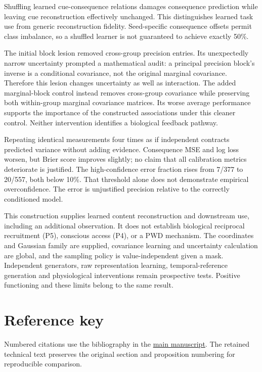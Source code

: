 \documentclass[
  american,
  11pt,
  letterpaper,
]{article}
\begin{document}
Shuffling learned cue-consequence relations damages consequence prediction while leaving cue reconstruction effectively unchanged. This distinguishes learned task use from generic reconstruction fidelity. Seed-specific consequence offsets permit class imbalance, so a shuffled learner is not guaranteed to achieve exactly 50\%.

The initial block lesion removed cross-group precision entries. Its unexpectedly narrow uncertainty prompted a mathematical audit: a principal precision block's inverse is a conditional covariance, not the original marginal covariance. Therefore this lesion changes uncertainty as well as interaction. The added marginal-block control instead removes cross-group covariance while preserving both within-group marginal covariance matrices. Its worse average performance supports the importance of the constructed associations under this cleaner control. Neither intervention identifies a biological feedback pathway.

Repeating identical measurements four times as if independent contracts predicted variance without adding evidence. Consequence MSE and log loss worsen, but Brier score improves slightly; no claim that all calibration metrics deteriorate is justified. The high-confidence error fraction rises from 7/377 to 20/557, both below 10\%. That threshold alone does not demonstrate empirical overconfidence. The error is unjustified precision relative to the correctly conditioned model.

This construction supplies learned content reconstruction and downstream use, including an additional observation. It does not establish biological reciprocal recruitment (P5), conscious access (P4), or a PWD mechanism. The coordinates and Gaussian family are supplied, covariance learning and uncertainty calculation are global, and the sampling policy is value-independent given a mask. Independent generators, raw representation learning, temporal-reference generation and physiological interventions remain prospective tests. Positive functioning and these limits belong to the same result.

\section{Reference key}\label{reference-key}

Numbered citations use the bibliography in the \href{https://zenodo.org/records/23455801/files/Learning-to-Feel-v1.1.pdf}{main manuscript}. The retained technical text preserves the original section and proposition numbering for reproducible comparison.
\end{document}
